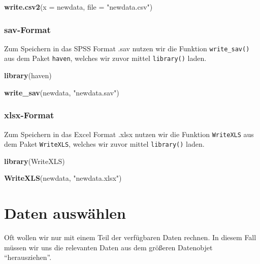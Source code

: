 \documentclass[
]{book}
\newenvironment{Shaded}{\begin{snugshade}}{\end{snugshade}}
\newcommand{\AttributeTok}[1]{\textcolor[rgb]{0.13,0.29,0.53}{#1}}
\newcommand{\FunctionTok}[1]{\textcolor[rgb]{0.13,0.29,0.53}{\textbf{#1}}}
\newcommand{\NormalTok}[1]{#1}
\newcommand{\StringTok}[1]{\textcolor[rgb]{0.31,0.60,0.02}{#1}}
\begin{document}
\begin{Shaded}
\begin{Highlighting}[]
\FunctionTok{write.csv2}\NormalTok{(}\AttributeTok{x =}\NormalTok{ newdata, }\AttributeTok{file =} \StringTok{"newdata.csv"}\NormalTok{)}
\end{Highlighting}
\end{Shaded}

\subsection{sav-Format}\label{sav-format-1}

Zum Speichern in das SPSS Format .sav nutzen wir die Funktion \texttt{write\_sav()} aus dem Paket \texttt{haven}, welches wir zuvor mittel \texttt{library()} laden.

\begin{Shaded}
\begin{Highlighting}[]
\FunctionTok{library}\NormalTok{(haven)}

\FunctionTok{write\_sav}\NormalTok{(newdata, }\StringTok{"newdata.sav"}\NormalTok{)}
\end{Highlighting}
\end{Shaded}

\subsection{xlsx-Format}\label{xlsx-format-1}

Zum Speichern in das Excel Format .xlsx nutzen wir die Funktion \texttt{WriteXLS} aus dem Paket \texttt{WriteXLS}, welches wir zuvor mittel \texttt{library()} laden.

\begin{Shaded}
\begin{Highlighting}[]
\FunctionTok{library}\NormalTok{(WriteXLS)}

\FunctionTok{WriteXLS}\NormalTok{(newdata, }\StringTok{"newdata.xlsx"}\NormalTok{)}
\end{Highlighting}
\end{Shaded}

\chapter{Daten auswählen}\label{daten-auswuxe4hlen}

Oft wollen wir nur mit einem Teil der verfügbaren Daten rechnen. In diesem Fall müssen wir uns die relevanten Daten aus dem größeren Datenobjet ``herausziehen''.
\end{document}
